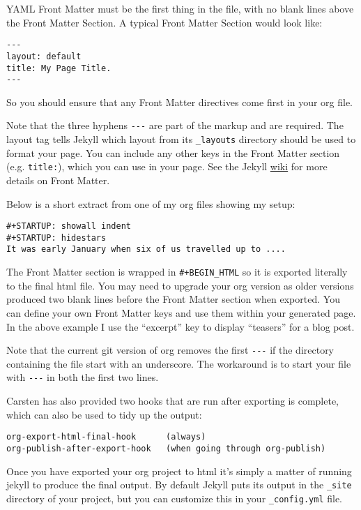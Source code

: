 \documentclass{article}
\begin{document}
YAML Front Matter must be the first thing in the file, with no blank
lines above the Front Matter Section. A typical Front Matter Section
would look like:


\begin{verbatim}
---
layout: default
title: My Page Title.
---
\end{verbatim}

So you should ensure that any Front Matter directives come first in your
org file.

Note that the three hyphens \texttt{-{}-{}-} are part of the markup and are
required. The layout tag tells Jekyll which layout from its \texttt{\_layouts}
directory should be used to format your page. You can include any other
keys in the Front Matter section (e.g. \texttt{title:}), which you can use in
your page. See the Jekyll
\href{http://wiki.github.com/mojombo/jekyll/yaml-front-matter}{wiki} for
more details on Front Matter.

Below is a short extract from one of my org files showing my setup:


\begin{verbatim}
#+STARTUP: showall indent
#+STARTUP: hidestars
It was early January when six of us travelled up to ....
\end{verbatim}

The Front Matter section is wrapped in \texttt{\#+BEGIN\_HTML} so it is exported
literally to the final html file. You may need to upgrade your org
version as older versions produced two blank lines before the Front
Matter section when exported. You can define your own Front Matter keys
and use them within your generated page. In the above example I use the
``excerpt'' key to display ``teasers'' for a blog post.

Note that the current git version of org removes the first \texttt{-{}-{}-} if the
directory containing the file start with an underscore. The workaround
is to start your file with \texttt{-{}-{}-} in both the first two lines.

Carsten has also provided two hooks that are run after exporting is
complete, which can also be used to tidy up the output:


\begin{verbatim}
org-export-html-final-hook      (always)
org-publish-after-export-hook   (when going through org-publish)
\end{verbatim}

Once you have exported your org project to html it's simply a matter of
running jekyll to produce the final output. By default Jekyll puts its
output in the \texttt{\_site} directory of your project, but you can customize
this in your \texttt{\_config.yml} file.
\end{document}
